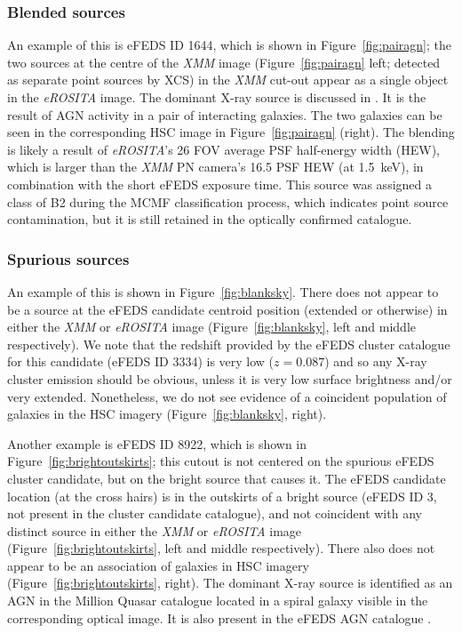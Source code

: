 \documentclass[fleqn,usenatbib]{mnras}
\begin{document}
\subsubsection{Blended sources}
\label{subsubsec:blended}

An example of this is eFEDS ID 1644, which is shown in Figure~\ref{fig:pairagn}; the two sources at the centre of the {\em XMM} image (Figure~\ref{fig:pairagn} left; detected as separate point sources by XCS) in the {\em XMM} cut-out appear as a single object in the {\em eROSITA} image. The dominant X-ray source is discussed in \cite{agnpair}. It is the result of AGN activity in a pair of interacting galaxies. The two galaxies can be seen in the corresponding HSC image in Figure~\ref{fig:pairagn} (right). The blending is likely a result of {\em eROSITA}'s 26{\arcsec} FOV average PSF half-energy width (HEW), which is larger than the {\em XMM} PN camera's 16.5{\arcsec} PSF HEW (at 1.5~keV), in combination with the short eFEDS exposure time. This source was assigned a class of B2 during the MCMF classification process, which indicates point source contamination, but it is still retained in the optically confirmed catalogue.

\subsubsection{Spurious sources}
\label{subsubsec:spurious}
An example of this is shown in Figure~\ref{fig:blanksky}. There does not appear to be a source at the eFEDS candidate centroid position (extended or otherwise) in either the {\em XMM} or {\em eROSITA} image (Figure~\ref{fig:blanksky}, left and middle respectively). We note that the redshift provided by the eFEDS cluster catalogue for this candidate (eFEDS ID 3334) is very low ($z{=}0.087$) and so any X-ray cluster emission should be obvious, unless it is very low surface brightness and/or very extended. Nonetheless, we do not see evidence of a coincident population of galaxies in the HSC imagery (Figure~\ref{fig:blanksky}, right). 

Another example is eFEDS ID 8922, which is shown in Figure~\ref{fig:brightoutskirts}; this cutout is not centered on the spurious eFEDS cluster candidate, but on the bright source that causes it. The eFEDS candidate location (at the cross hairs) is in the outskirts of a bright source (eFEDS ID 3, not present in the cluster candidate catalogue), and not coincident with any distinct source in either the {\em XMM} or {\em eROSITA} image (Figure~\ref{fig:brightoutskirts}, left and middle respectively). There also does not appear to be an association of galaxies in HSC imagery (Figure~\ref{fig:brightoutskirts}, right). The dominant X-ray source is identified as an AGN in the Million Quasar catalogue \citep{milliquas} located in a spiral galaxy visible in the corresponding optical image. It is also present in the eFEDS AGN catalogue \citep[][]{efedsagn}.
\end{document}

